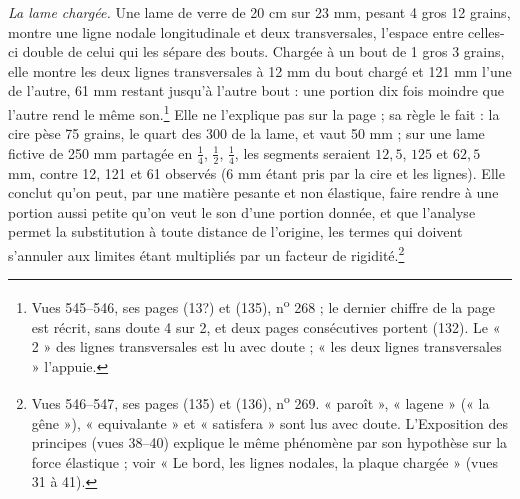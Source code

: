 \documentclass[11pt,a4paper]{article}
\begin{document}
\emph{La lame chargée.} Une lame de verre de 20 cm sur 23 mm, pesant 4 gros 12
grains, montre une ligne nodale longitudinale et deux transversales, l'espace
entre celles-ci double de celui qui les sépare des bouts. Chargée à un bout de
1 gros 3 grains, elle montre les deux lignes transversales à 12 mm du bout chargé
et 121 mm l'une de l'autre, 61 mm restant jusqu'à l'autre bout : une portion dix
fois moindre que l'autre rend le même son.\footnote{Vues 545--546, ses pages
(13?) et (135), n\textsuperscript{o} 268 ; le dernier chiffre de la page est
récrit, sans doute 4 sur 2, et deux pages consécutives portent (132). Le « 2 »
des lignes transversales est lu avec doute ; « les deux lignes transversales »
l'appuie.} Elle ne l'explique pas sur la page ; sa règle le fait : la cire pèse
75 grains, le quart des 300 de la lame, et vaut 50 mm ; sur une lame fictive de
250 mm partagée en $\frac14$, $\frac12$, $\frac14$, les segments seraient
$12{,}5$, $125$ et $62{,}5$ mm, contre 12, 121 et 61 observés (6 mm étant pris
par la cire et les lignes). Elle conclut qu'on peut, par une matière pesante et
non élastique, faire rendre à une portion aussi petite qu'on veut le son d'une
portion donnée, et que l'analyse permet la substitution à toute distance de
l'origine, les termes qui doivent s'annuler aux limites étant multipliés par un
facteur de rigidité.\footnote{Vues 546--547, ses pages (135) et (136),
n\textsuperscript{o} 269. « paroît », « lagene » (« la gêne »), « equivalante »
et « satisfera » sont lus avec doute. L'Exposition des principes (vues 38--40)
explique le même phénomène par son hypothèse sur la force élastique ; voir « Le
bord, les lignes nodales, la plaque chargée » (vues 31 à 41).}
\end{document}

